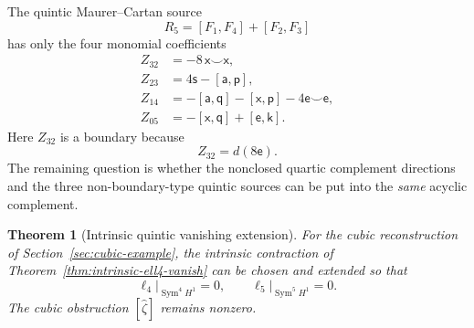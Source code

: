 \documentclass[11pt]{amsart}
\newtheorem{theorem}{Theorem}[section]
\begin{document}
The quintic Maurer--Cartan source
\[
R_5=[F_1,F_4]+[F_2,F_3]
\]
has only the four monomial coefficients
\begin{align}
Z_{32}&=-8\,\mathsf x\smile\mathsf x,\label{eq:arity5-Z32}\\
Z_{23}&=4\mathsf s-[\mathsf a,\mathsf p],\label{eq:arity5-Z23}\\
Z_{14}&=-[\mathsf a,\mathsf q]-[\mathsf x,\mathsf p]-4\mathsf e\smile\mathsf e,\label{eq:arity5-Z14}\\
Z_{05}&=-[\mathsf x,\mathsf q]+[\mathsf e,\mathsf k].\label{eq:arity5-Z05}
\end{align}
Here $Z_{32}$ is a boundary because
\[
Z_{32}=d(8\mathsf e).
\]
The remaining question is whether the nonclosed quartic complement directions and the three non-boundary-type quintic sources can be put into the \emph{same} acyclic complement.

\begin{theorem}[Intrinsic quintic vanishing extension]\label{thm:intrinsic-ell5-vanish}
For the cubic reconstruction of Section~\ref{sec:cubic-example}, the intrinsic contraction of Theorem~\ref{thm:intrinsic-ell4-vanish} can be chosen and extended so that
\[
\boxed{
\ell_4\big|_{\operatorname{Sym}^4H^1}=0,
\qquad
\ell_5\big|_{\operatorname{Sym}^5H^1}=0.
}
\]
The cubic obstruction $[\widehat\zeta]$ remains nonzero.
\end{theorem}
\end{document}
